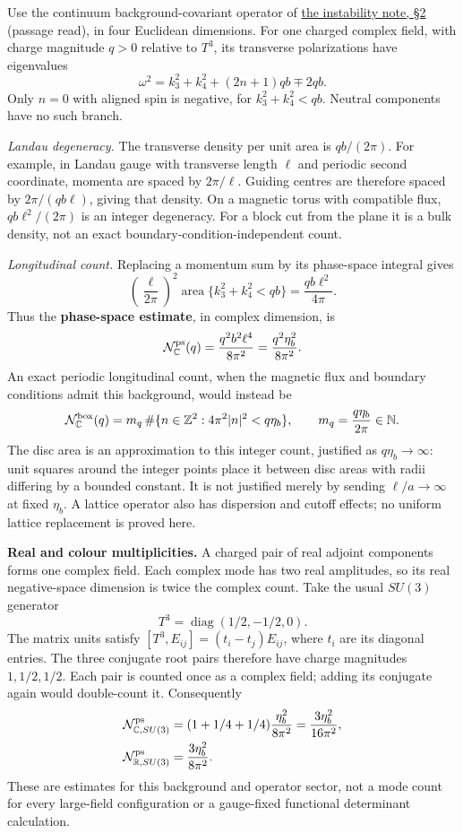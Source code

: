 \documentclass[11pt,a4paper]{article}
\begin{document}
Use the continuum background-covariant operator of
\href{flow-instability-large-field.md}{the instability note, §2}
(passage read), in four Euclidean dimensions. For one charged complex
field, with charge magnitude \(q>0\) relative to \(T^3\), its transverse
polarizations have eigenvalues \[\omega^2=k_3^2+k_4^2+(2n+1)qb\mp2qb.\]
Only \(n=0\) with aligned spin is negative, for \(k_3^2+k_4^2<qb\).
Neutral components have no such branch.

\emph{Landau degeneracy.} The transverse density per unit area is
\(qb/(2\pi)\). For example, in Landau gauge with transverse length
\(\ell\) and periodic second coordinate, momenta are spaced by
\(2\pi/\ell\). Guiding centres are therefore spaced by
\(2\pi/(qb\ell)\), giving that density. On a magnetic torus with
compatible flux, \(qb\ell^2/(2\pi)\) is an integer degeneracy. For a
block cut from the plane it is a bulk density, not an exact
boundary-condition-independent count.

\emph{Longitudinal count.} Replacing a momentum sum by its phase-space
integral gives \[\left(\frac\ell{2\pi}\right)^2
\operatorname{area}\{k_3^2+k_4^2<qb\}
=\frac{qb\ell^2}{4\pi}.\] Thus the \textbf{phase-space estimate}, in
complex dimension, is \[\mathcal N_{\mathbb C}^{\rm ps}(q)
=\frac{q^2b^2\ell^4}{8\pi^2}
=\frac{q^2\eta_b^2}{8\pi^2}.\] An exact periodic longitudinal count,
when the magnetic flux and boundary conditions admit this background,
would instead be \[\mathcal N_{\mathbb C}^{\rm box}(q)
=m_q\,\#\{n\in\mathbb Z^2:4\pi^2|n|^2<q\eta_b\},
\qquad m_q=\frac{q\eta_b}{2\pi}\in\mathbb N.\] The disc area is an
approximation to this integer count, justified as \(q\eta_b\to\infty\):
unit squares around the integer points place it between disc areas with
radii differing by a bounded constant. It is not justified merely by
sending \(\ell/a\to\infty\) at fixed \(\eta_b\). A lattice operator also
has dispersion and cutoff effects; no uniform lattice replacement is
proved here.

\textbf{Real and colour multiplicities.} A charged pair of real adjoint
components forms one complex field. Each complex mode has two real
amplitudes, so its real negative-space dimension is twice the complex
count. Take the usual \(SU(3)\) generator
\[T^3=\operatorname{diag}(1/2,-1/2,0).\] The matrix units satisfy
\([T^3,E_{ij}]=(t_i-t_j)E_{ij}\), where \(t_i\) are its diagonal
entries. The three conjugate root pairs therefore have charge magnitudes
\(1,1/2,1/2\). Each pair is counted once as a complex field; adding its
conjugate again would double-count it. Consequently \[\begin{aligned}
\mathcal N_{\mathbb C,SU(3)}^{\rm ps}
&=(1+1/4+1/4)\frac{\eta_b^2}{8\pi^2}
=\frac{3\eta_b^2}{16\pi^2},\\
\mathcal N_{\mathbb R,SU(3)}^{\rm ps}
&=\frac{3\eta_b^2}{8\pi^2}.
\end{aligned}\] These are estimates for this background and operator
sector, not a mode count for every large-field configuration or a
gauge-fixed functional determinant calculation.
\end{document}
